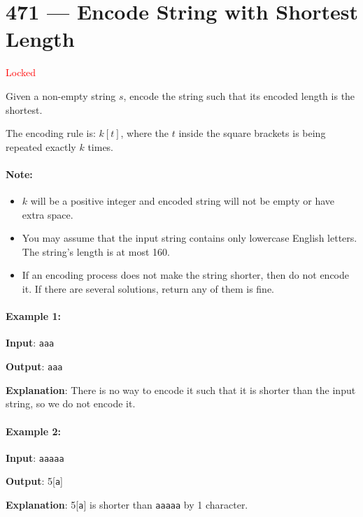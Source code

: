 \section{471 --- Encode String with Shortest Length}
\textcolor{red}{\large Locked}


Given a non-empty string $s$, encode the string such that its encoded length is the shortest.

The encoding rule is: $k[t]$, where the $t$ inside the square brackets is being repeated exactly $k$ times.

\paragraph{Note:}
\begin{itemize}
\item $k$ will be a positive integer and encoded string will not be empty or have extra space.
\item You may assume that the input string contains only lowercase English letters. The string's length is at most 160.
\item If an encoding process does not make the string shorter, then do not encode it. If there are several solutions, return any of them is fine.
\end{itemize}

\paragraph{Example 1:}

\begin{flushleft}
\textbf{Input}: \texttt{aaa}

\textbf{Output}: \texttt{aaa}

\textbf{Explanation}: There is no way to encode it such that it is shorter than the input string, so we do not encode it.

\end{flushleft}
\paragraph{Example 2:}

\begin{flushleft}
\textbf{Input}: \texttt{aaaaa}

\textbf{Output}: 5[\texttt{a}]

\textbf{Explanation}: 5[\texttt{a}] is shorter than \texttt{aaaaa} by 1 character.

\end{flushleft}

